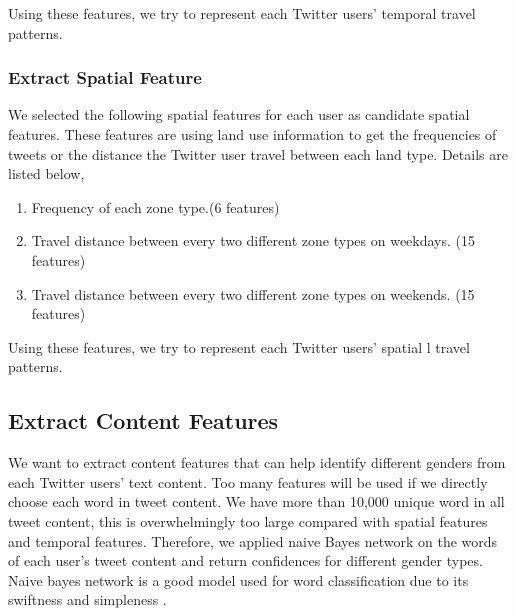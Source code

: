 \documentclass{article}
\begin{document}
Using these features, we try to represent each Twitter users' temporal travel patterns.

\subsubsection{Extract Spatial Feature}

We selected the following spatial features for each user  as candidate spatial features. These features are using land use information to get the frequencies of tweets or the distance the Twitter user travel between each land type. Details are listed below,

\begin{enumerate}
\item Frequency of each zone type.(6 features)
\item Travel distance between every two different zone types on weekdays. (15 features)
\item Travel distance between every two different zone types on weekends. (15 features)
\end{enumerate}

Using these features, we try to represent each Twitter users' spatial l travel patterns.

\subsection{Extract Content Features}

We want to extract content features that can help identify different genders from each Twitter users' text content. Too many features will be used if we directly choose each word in tweet content. We have more than 10,000 unique word in all tweet content, this is overwhelmingly too large compared with spatial features and temporal features. Therefore, we applied naive Bayes network on the words of each user's tweet content and return confidences for different gender types.  Naive bayes network is a good model used for word classification due to its swiftness and simpleness \cite{cheng2010you,hansen2011good}.
\end{document}
